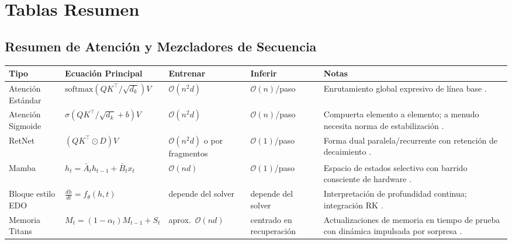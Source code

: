 \section{Tablas Resumen}
\label{sec:summary-tables}

\subsection{Resumen de Atención y Mezcladores de Secuencia}
\small
\begin{longtable}{p{2.4cm}p{3.2cm}p{2.0cm}p{2.0cm}p{4.8cm}}
\toprule
\textbf{Tipo} & \textbf{Ecuación Principal} & \textbf{Entrenar} & \textbf{Inferir} & \textbf{Notas} \\
\midrule
\endhead
Atención Estándar & $\text{softmax}(QK^\top/\sqrt{d_k})V$ & $\mathcal{O}(n^2d)$ & $\mathcal{O}(n)$/paso & Enrutamiento global expresivo de línea base \citep{vaswani_attention_2017}. \\
Atención Sigmoide & $\sigma(QK^\top/\sqrt{d_k}+b)V$ & $\mathcal{O}(n^2d)$ & $\mathcal{O}(n)$/paso & Compuerta elemento a elemento; a menudo necesita norma de estabilización \citep{ramapuram_theory_2024}. \\
RetNet & $(QK^\top\odot D)V$ & $\mathcal{O}(n^2d)$ o por fragmentos & $\mathcal{O}(1)$/paso & Forma dual paralela/recurrente con retención de decaimiento \citep{sun_retentive_2023}. \\
Mamba & $h_t=\bar{A}_t h_{t-1}+\bar{B}_t x_t$ & $\mathcal{O}(nd)$ & $\mathcal{O}(1)$/paso & Espacio de estados selectivo con barrido consciente de hardware \citep{gu_mamba_2023}. \\
Bloque estilo EDO & $\frac{dh}{dt}=f_\theta(h,t)$ & depende del solver & depende del solver & Interpretación de profundidad continua; integración RK \citep{zhang_continuous_2021}. \\
Memoria Titans & $M_t=(1-\alpha_t)M_{t-1}+S_t$ & aprox.\ $\mathcal{O}(nd)$ & centrado en recuperación & Actualizaciones de memoria en tiempo de prueba con dinámica impulsada por sorpresa \citep{behrouz_titans_2025}. \\
\bottomrule
\end{longtable}
\normalsize

